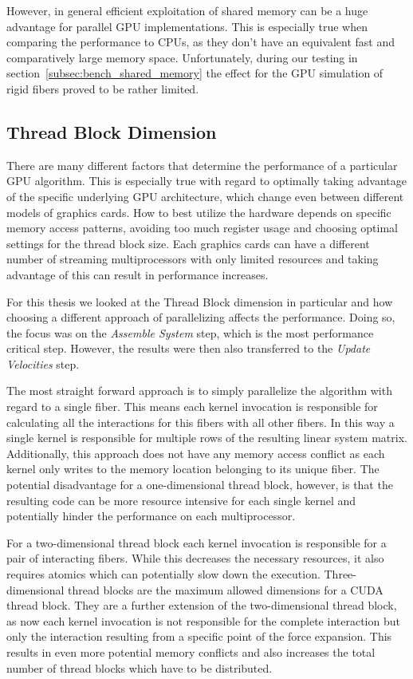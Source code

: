 However, in general efficient exploitation of shared memory can be a huge advantage for parallel GPU implementations. This is especially true when comparing the performance to CPUs, as they don't have an equivalent fast and comparatively large memory space. Unfortunately, during our testing in section~\ref{subsec:bench_shared_memory} the effect for the GPU simulation of rigid fibers proved to be rather limited.

\subsection{Thread Block Dimension}
\label{subsec:bench_thread_block}

There are many different factors that determine the performance of a particular GPU algorithm. This is especially true with regard to optimally taking advantage of the specific underlying GPU architecture, which change even between different models of graphics cards. How to best utilize the hardware depends on specific memory access patterns, avoiding too much register usage and choosing optimal settings for the thread block size. Each graphics cards can have a different number of streaming multiprocessors with only limited resources and taking advantage of this can result in performance increases.

For this thesis we looked at the Thread Block dimension in particular and how choosing a different approach of parallelizing affects the performance. Doing so, the focus was on the \emph{Assemble System} step, which is the most performance critical step. However, the results were then also transferred to the \emph{Update Velocities} step.

The most straight forward approach is to simply parallelize the algorithm with regard to a single fiber. This means each kernel invocation is responsible for calculating all the interactions for this fibers with all other fibers. In this way a single kernel is responsible for multiple rows of the resulting linear system matrix. Additionally, this approach does not have any memory access conflict as each kernel only writes to the memory location belonging to its unique fiber. The potential disadvantage for a one-dimensional thread block, however, is that the resulting code can be more resource intensive for each single kernel and potentially hinder the performance on each multiprocessor.

For a two-dimensional thread block each kernel invocation is responsible for a pair of interacting fibers. While this decreases the necessary resources, it also requires atomics which can potentially slow down the execution. Three-dimensional thread blocks are the maximum allowed dimensions for a CUDA thread block. They are a further extension of the two-dimensional thread block, as now each kernel invocation is not responsible for the complete interaction but only the interaction resulting from a specific point of the force expansion. This results in even more potential memory conflicts and also increases the total number of thread blocks which have to be distributed.

